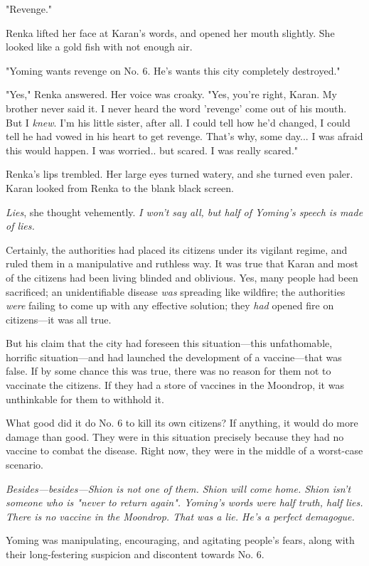 "Revenge."

Renka lifted her face at Karan's words, and opened her mouth slightly.
She looked like a gold fish with not enough air.

"Yoming wants revenge on No. 6. He's wants this city completely
destroyed."

"Yes," Renka answered. Her voice was croaky. "Yes, you're right, Karan.
My brother never said it. I never heard the word 'revenge' come out of
his mouth. But I \emph{knew}. I'm his little sister, after all. I could tell
how he'd changed, I could tell he had vowed in his heart to get revenge.
That's why, some day... I was afraid this would happen. I was worried..
but scared. I was really scared."

Renka's lips trembled. Her large eyes turned watery, and she turned even
paler. Karan looked from Renka to the blank black screen.

\emph{Lies}, she thought vehemently. \emph{I won't say all, but half of Yoming's
speech is made of lies.}

Certainly, the authorities had placed its citizens under its vigilant
regime, and ruled them in a manipulative and ruthless way. It was true
that Karan and most of the citizens had been living blinded and
oblivious. Yes, many people had been sacrificed; an unidentifiable
disease \emph{was} spreading like wildfire; the authorities \emph{were} failing to
come up with any effective solution; they \emph{had} opened fire on citizens---it
was all true.

But his claim that the city had foreseen this situation---this
unfathomable, horrific situation---and had launched the development of a
vaccine---that was false. If by some chance this was true, there was no
reason for them not to vaccinate the citizens. If they had a store of
vaccines in the Moondrop, it was unthinkable for them to withhold it.

What good did it do No. 6 to kill its own citizens? If anything, it
would do more damage than good. They were in this situation precisely
because they had no vaccine to combat the disease. Right now, they were
in the middle of a worst-case scenario.

\emph{Besides---besides---Shion is not one of them. Shion will come home. Shion
isn't someone who is "never to return again". Yoming's words were half
truth, half lies. There is no vaccine in the Moondrop. That was a lie.
He's a perfect demagogue.}

Yoming was manipulating, encouraging, and agitating people's fears,
along with their long-festering suspicion and discontent towards No. 6.

